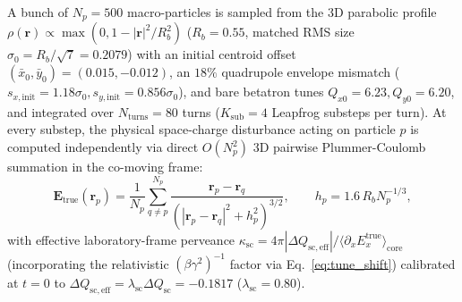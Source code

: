 \documentclass[11pt,a4paper]{article}
\begin{document}
A bunch of $N_p = 500$ macro-particles is sampled from the 3D parabolic profile $\rho(\bm{r}) \propto \max(0, 1 - |\bm{r}|^2/R_b^2)$ ($R_b = 0.55$, matched RMS size $\sigma_0 = R_b / \sqrt{7} = 0.2079$) with an initial centroid offset $(\bar{x}_0, \bar{y}_0) = (0.015, -0.012)$, an $18\%$ quadrupole envelope mismatch ($s_{x,\mathrm{init}} = 1.18\sigma_0, s_{y,\mathrm{init}} = 0.856\sigma_0$), and bare betatron tunes $Q_{x0} = 6.23, Q_{y0} = 6.20$, and integrated over $N_{\mathrm{turns}} = 80$ turns ($K_{\mathrm{sub}} = 4$ Leapfrog substeps per turn). At every substep, the physical space-charge disturbance acting on particle $p$ is computed independently via direct $O(N_p^2)$ 3D pairwise Plummer-Coulomb summation in the co-moving frame:
\begin{equation}
    \bm{E}_{\mathrm{true}}(\bm{r}_p) = \frac{1}{N_p} \sum_{q \ne p}^{N_p} \frac{\bm{r}_p - \bm{r}_q}{\left( |\bm{r}_p - \bm{r}_q|^2 + h_p^2 \right)^{3/2}}, \qquad h_p = 1.6\, R_b N_p^{-1/3},
    \label{eq:pairwise_coulomb}
\end{equation}
with effective laboratory-frame perveance $\kappa_{\mathrm{sc}} = 4\pi |\Delta Q_{\mathrm{sc,eff}}| / \langle \partial_x E_x^{\mathrm{true}} \rangle_{\mathrm{core}}$ (incorporating the relativistic $(\beta\gamma^2)^{-1}$ factor via Eq.~\eqref{eq:tune_shift}) calibrated at $t=0$ to $\Delta Q_{\mathrm{sc,eff}} = \lambda_{\mathrm{sc}} \Delta Q_{\mathrm{sc}} = -0.1817$ ($\lambda_{\mathrm{sc}} = 0.80$).
\end{document}
